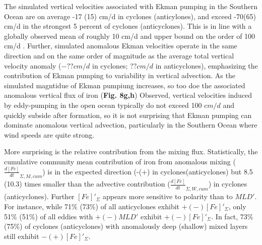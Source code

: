 The simulated vertical velocities associated with Ekman pumping in the Southern Ocean are on average -17 (15) cm/d in cyclones (anticylones), and exceed -70(65) cm/d in the strongest 5 percent of cyclones (anticyclones). This is in line with a globally observed mean of roughly 10 cm/d \parencite{GaubeSatelliteObservationsMesoscale2014} and upper bound on the order of 100 cm/d \parencite{MartinMechanismsverticalnutrient2001}. Further, simulated anomalous Ekman velocities operate in the same direction and on the same order of magnitude as the average total vertical velocity anomaly ($-??cm/d$ in cyclones; $??cm/d$ in anticyclones), emphasizing the contribution of Ekman pumping to variability in vertical advection. As the simulated magntidue of Ekman pumpiung increases, so too doe the associated anomalous vertical flux of iron (\textbf{Fig. 8g,h}) Observed, vertical velocities induced by eddy-pumping in the open ocean typically do not exceed 100 $cm/d$ \parencite{SiegelMesoscaleeddiessatellite1999,GaubeSatelliteObservationsMesoscale2014} and quickly subside after formation, so it is not surprising that Ekman pumping can  dominate anomalous vertical advection, particularly in the Southern Ocean where wind speeds are quite strong. 
    
More surprising is the relative contribution from the mixing flux. Statistically, the cumulative community mean contribution of iron from anomalous mixing ($\frac{d[Fe]}{dt}_{\Sigma, M, cum}$) is in the expected direction (-(+) in cyclones(anticyclones) but 8.5 (10.3) times smaller than the advective contribution ($\frac{d[Fe]}{dt}_{\Sigma, W, cum}$) in cyclones (anticyclones). Further $[Fe]'_\Sigma$ appears more sensitive to polarity than to $MLD'$. For instance, while 71\% (73\%) of all anticyclones exhibit $+(-)[Fe]'_\Sigma$, only 51\% (51\%) of all eddies with $+(-)MLD'$ exhibit $+(-)[Fe]'_\Sigma$. In fact, 73\% (75\%) of cyclones (anticyclones) with anomalously deep (shallow) mixed layers still exhibit $-(+)[Fe]'_\Sigma$.

